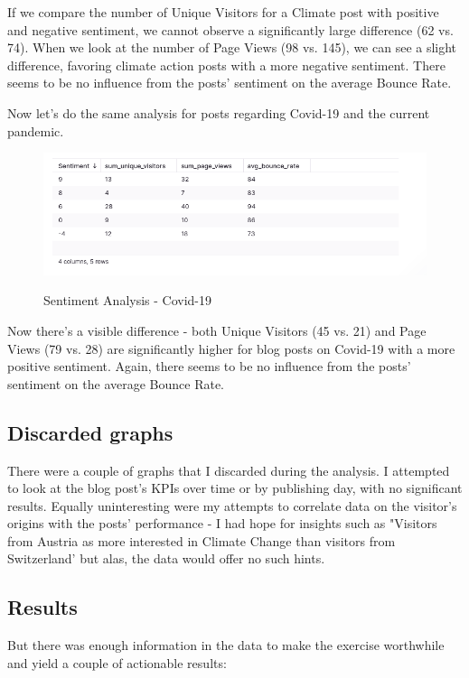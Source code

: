 If we compare the number of Unique Visitors for a Climate post with positive and negative sentiment, we cannot observe a significantly large difference (62 vs. 74). When we look at the number of Page Views (98 vs. 145), we can see a slight difference, favoring climate action posts with a more negative sentiment. There seems to be no influence from the posts' sentiment on the average Bounce Rate.

Now let's do the same analysis for posts regarding Covid-19 and the current pandemic.

\begin{figure}[H]
\centering
\caption {Sentiment Analysis - Covid-19}
\includegraphics[width=\linewidth]{images/analysis-sentiment-covid.png}
\label{fig:sentimentCovid}
\end{figure}

Now there's a visible difference - both Unique Visitors (45 vs. 21) and Page Views (79 vs. 28) are significantly higher for blog posts on Covid-19 with a more positive sentiment. Again, there seems to be no influence from the posts' sentiment on the average Bounce Rate.

\subsection{Discarded graphs}

There were a couple of graphs that I discarded during the analysis. I attempted to look at the blog post's KPIs over time or by publishing day, with no significant results. Equally uninteresting were my attempts to correlate data on the visitor's origins with the posts' performance - I had hope for insights such as "Visitors from Austria as more interested in Climate Change than visitors from Switzerland' but alas, the data would offer no such hints.

\subsection{Results}

But there was enough information in the data to make the exercise worthwhile and yield a couple of actionable results:

